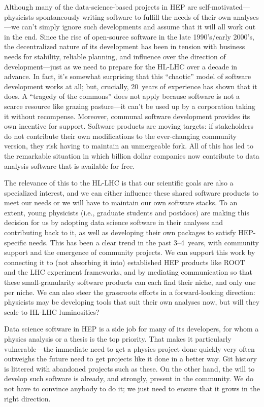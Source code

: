 \documentclass[12pt,a4paper]{article}
\begin{document}
Although many of the data-science-based projects in HEP are self-motivated---physicists spontaneously writing software to fulfill the needs of their own analyses---we can't simply ignore such developments and assume that it will all work out in the end. Since the rise of open-source software in the late 1990's/early 2000's, the decentralized nature of its development has been in tension with business needs for stability, reliable planning, and influence over the direction of development---just as we need to prepare for the HL-LHC over a decade in advance. In fact, it's somewhat surprising that this ``chaotic'' model of software development works at all; but, crucially, 20~years of experience has shown that it does. A ``tragedy of the commons'' does not apply because software is not a scarce resource like grazing pasture---it can't be used up by a corporation taking it without recompense. Moreover, communal software development provides its own incentive for support. Software products are moving targets: if stakeholders do not contribute their own modifications to the ever-changing community version, they risk having to maintain an unmergeable fork. All of this has led to the remarkable situation in which billion dollar companies now contribute to data analysis software that is available for free.

The relevance of this to the HL-LHC is that our scientific goals are also a specialized interest, and we can either influence these shared software products to meet our needs or we will have to maintain our own software stacks. To an extent, young physicists (i.e., graduate students and postdocs) are making this decision for us by adopting data science software in their analyses and contributing back to it, as well as developing their own packages to satisfy HEP-specific needs. This has been a clear trend in the past 3--4~years, with community support and the emergence of community projects. We can support this work by connecting it to (not absorbing it into) established HEP products like ROOT~\cite{citeulike:363715} and the LHC experiment frameworks, and by mediating communication so that these small-granularity software products can each find their niche, and only one per niche. We can also steer the grassroots efforts in a forward-looking direction: physicists may be developing tools that suit their own analyses now, but will they scale to HL-LHC luminosities?

Data science software in HEP is a side job for many of its developers, for whom a physics analysis or a thesis is the top priority. That makes it particularly vulnerable---the immediate need to get a physics project done quickly very often outweighs the future need to get projects like it done in a better way. Git history is littered with abandoned projects such as these. On the other hand, the will to develop such software is already, and strongly, present in the community. We do not have to convince anybody to do it; we just need to ensure that it grows in the right direction.
\end{document}
